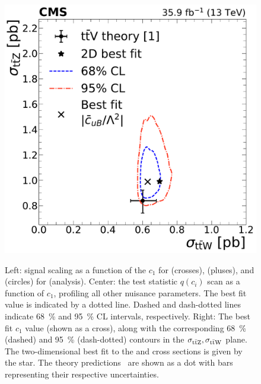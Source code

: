\begin{landscape}
\begin{figure}
{        \includegraphics[height=\textheight]{figures/thirteen-TeV/NP/2D/ttZ_ttW_2D_1D_cuB}
      }
    \setlength{\capwidth}{14cm}
    \caption[Profile likelihood, $\mu(c_1)$, and best fit $c_1$ for \cuB (\thirteenTeV)]{Left: signal scaling as a function of the $c_1$ for \ttW (crosses), \ttZ (pluses), and \ttH (circles) for \cuB (\thirteenTeV analysis). Center: the test statistic $q(c_i)$ scan as a function of $c_1$, profiling all other nuisance parameters. The best fit value is indicated by a dotted line. Dashed and dash-dotted lines indicate \SI{68}{\percent} and \SI{95}{\percent} CL intervals, respectively. Right: The best fit $c_1$ value (shown as a cross), along with the corresponding \SI{68}{\percent} (dashed) and \SI{95}{\percent} (dash-dotted) contours in the $\sigma_{\text{t}\bar{\text{t}}\text{Z}}, \sigma_{\text{t}\bar{\text{t}}\text{W}}$ plane. The two-dimensional best fit to the \ttW and \ttZ cross sections is given by the star. The theory predictions~\cite{deFlorian:2016spz} are shown as a dot with bars representing their respective uncertainties.}
    \label{fig:results-cuB}
  \end{figure}
  \begin{figure}
      \resizebox{!}{7.2cm}{
}
\end{figure}
\end{landscape}
